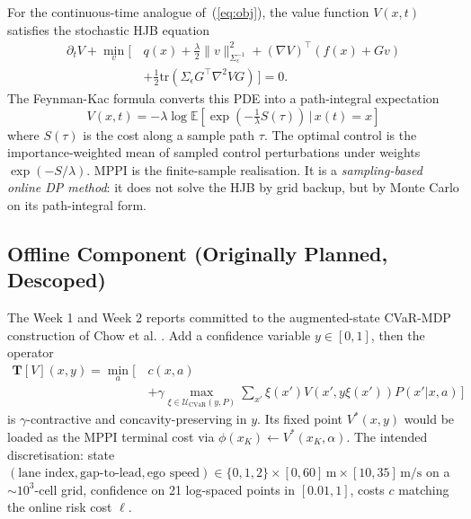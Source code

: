 \documentclass[letterpaper, 10 pt, conference]{ieeeconf}
\begin{document}
For the continuous-time analogue of~(\ref{eq:obj}), the value function $V(x, t)$ satisfies the stochastic HJB equation
\begin{equation}
\begin{aligned}
\partial_t V + \min_v \Big[\, & q(x) + \tfrac{\lambda}{2}\| v \|^2_{\Sigma_\epsilon^{-1}} + (\nabla V)^\top (f(x) + Gv) \\
& + \tfrac{1}{2}\mathrm{tr}(\Sigma_\epsilon G^\top \nabla^2 V G) \,\Big] = 0.
\end{aligned}
\end{equation}
The Feynman-Kac formula \cite{williams2017mppi} converts this PDE into a path-integral expectation
\begin{equation}
V(x, t) = -\lambda \log \mathbb{E}\!\left[ \exp\!\left(-\tfrac{1}{\lambda} S(\tau)\right) \,\big|\, x(t) = x \right]
\label{eq:fk}
\end{equation}
where $S(\tau)$ is the cost along a sample path $\tau$. The optimal control is the importance-weighted mean of sampled control perturbations under weights $\exp(-S/\lambda)$. MPPI is the finite-sample realisation. It is a \textit{sampling-based online DP method}: it does not solve the HJB by grid backup, but by Monte Carlo on its path-integral form.

\subsection{Offline Component (Originally Planned, Descoped)}
\label{sec:offline_planned}

The Week 1 and Week 2 reports committed to the augmented-state CVaR-MDP construction of Chow et al. \cite{chow2015risk}. Add a confidence variable $y \in [0, 1]$, then the operator
\begin{equation}
\begin{aligned}
\mathbf{T}[V](x, y) = \min_a \Big[\, & c(x, a) \\
& + \gamma \!\!\max_{\xi \in \mathcal{U}_\mathrm{CVaR}(y, P)} \!\!\sum_{x'} \xi(x') V(x', y\xi(x')) P(x' | x, a) \,\Big]
\end{aligned}
\label{eq:bellman}
\end{equation}
is $\gamma$-contractive and concavity-preserving in $y$. Its fixed point $V^*(x, y)$ would be loaded as the MPPI terminal cost via $\phi(x_K) \leftarrow V^*(x_K, \alpha)$. The intended discretisation: state $(\text{lane index}, \text{gap-to-lead}, \text{ego speed}) \in \{0,1,2\} \times [0, 60]\,\mathrm{m} \times [10, 35]\,\mathrm{m/s}$ on a $\sim\!10^3$-cell grid, confidence on 21 log-spaced points in $[0.01, 1]$, costs $c$ matching the online risk cost $\ell$.
\end{document}
